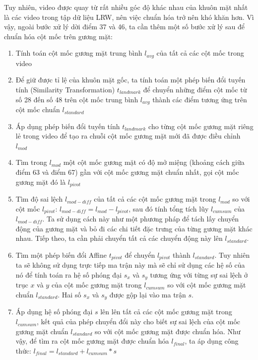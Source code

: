 Tuy nhiên, video được quay từ rất nhiều góc độ khác nhau của khuôn mặt nhất là các video trong tập dữ liệu LRW, nên việc chuẩn hóa trở nên khó khăn hơn. Vì vậy, ngoài bước xử lý dời điểm 37 và 46, ta cần thêm một số bước xử lý sau để chuẩn hóa cột mốc trên gương mặt:
\begin{enumerate}
    \item Tính toán cột mốc gương mặt trung bình $l_{avg}$ của tất cả các cột mốc trong video
    \item Để giữ được tỉ lệ của khuôn mặt gốc, ta tính toán một phép biến đổi tuyến tính (Similarity Transformation) $t_{landmark}$ để chuyển những điểm cột mốc từ số 28 đến số 48 trên cột mốc trung bình $l_{avg}$ thành các điểm tương ứng trên cột mốc chuẩn $l_{standard}$
    \item Áp dụng phép biến đổi tuyến tính $t_{landmark}$ cho từng cột mốc gương mặt riêng lẻ trong video để tạo ra chuỗi cột mốc gương mặt mới đã được điều chỉnh $l_{mod}$
    \item Tìm trong $l_{mod}$ một cột mốc gương mặt có độ mở miệng (khoảng cách giữa điểm 63 và điểm 67) gần với cột mốc gương mặt chuẩn nhất, gọi cột mốc gương mặt đó là $l_{pivot}$
    \item Tìm độ sai lệch $l_{mod-diff}$ của tất cả các cột mốc gương mặt trong $l_{mod}$ so với cột mốc $l_{pivot}$: $l_{mod-diff} = l_{mod} - l_{pivot}$, sau đó tính tổng tích lũy $l_{cumsum}$ của $l_{mod-diff}$. Ta sử dụng cách này như một phương pháp để tách lấy chuyển động của gương mặt và bỏ đi các chi tiết đặc trưng của từng gương mặt khác nhau. Tiếp theo, ta cần phải chuyển tất cả các chuyển động này lên $l_{standard}$.
    \item Tìm một phép biến đổi Affine $t_{pivot}$ để chuyển $l_{pivot}$ thành $l_{standard}$. Tuy nhiên ta sẽ không sử dụng trực tiếp ma trận này mà sẽ chỉ sử dụng các hệ số của nó để tính toán ra hệ số phóng đại $s_x$ và $s_y$ tương ứng với từng sự sai lệch ở trục $x$ và $y$ của cột mốc gương mặt trong $l_{cumsum}$ so với cột mốc gương mặt chuẩn $l_{standard}$. Hai số $s_x$ và $s_y$ được gộp lại vào ma trận $s$.
    \item Áp dụng hệ số phóng đại $s$ lên lên tất cả các cột mốc gương mặt trong $l_{cumsum}$, kết quả của phép chuyển đổi này cho biết sự sai lệch của cột mốc gương mặt chuẩn $l_{standard}$ so với cột mốc gương mặt được chuẩn hóa. Như vậy, để tìm ra cột mốc gương mặt được chuẩn hóa $l_{final}$, ta áp dụng công thức: $l_{final} = l_{standard} + l_{cumsum}*s$
\end{enumerate}


